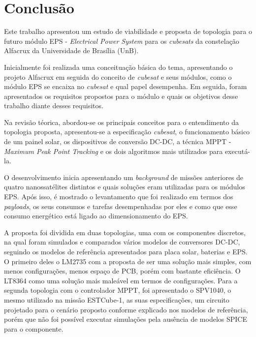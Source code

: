 \chapter{Conclusão} \label{conclusao}

Este trabalho apresentou um estudo de viabilidade e proposta de topologia para o futuro módulo EPS - \textit{Electrical Power System} para os \textit{cubesats} da constelação Alfacrux da Universidade de Brasília (UnB). 

Inicialmente foi realizada uma conceituação básica do tema, apresentando o projeto Alfacrux em seguida do conceito de \textit{cubesat} e seus módulos, como o módulo EPS se encaixa no \textit{cubesat} e qual papel desempenha. Em seguida, foram apresentados os requisitos propostos para o módulo e quais os objetivos desse trabalho diante desses requisitos.

Na revisão téorica, abordou-se os principais conceitos para o entendimento da topologia proposta, apresentou-se a especificação \textit{cubesat}, o funcionamento básico de um painel solar, os dispositivos de conversão DC-DC, a técnica MPPT - \textit{Maximum Peak Point Tracking} e os dois algoritmos mais utilizados para executá-la.

O desenvolvimento inicia apresentando um \textit{background} de missões anteriores de quatro nanossatélites distintos e quais soluções eram utilizadas para os módulos EPS. Após isso, é mostrado o levantamento que foi realizado em termos dos \textit{payloads}, os seus consumos e tarefas desempenhadas por eles e como que esse consumo energético está ligado ao dimensionamento do EPS.

A proposta foi dividida em duas topologias, uma com os componentes discretos, na qual foram simulados e comparados vários modelos de conversores DC-DC, seguindo os modelos de referência apresentados para placa solar, baterias e EPS. O primeiro deles o LM2735 com a proposta de ser uma solução mais simples, com menos configurações, menos espaço de PCB, porém com bastante eficiência. O LT8364 como uma solução mais maleável em termos de configurações. Para a segunda topologia com o controlador MPPT, foi apresentado o SPV1040, o mesmo utilizado na missão ESTCube-1, as suas especificações, um circuito projetado para o cenário proposto conforme explicado nos modelos de referência, porém que não foi possível executar simulações pela ausência de modelos SPICE para o componente.

